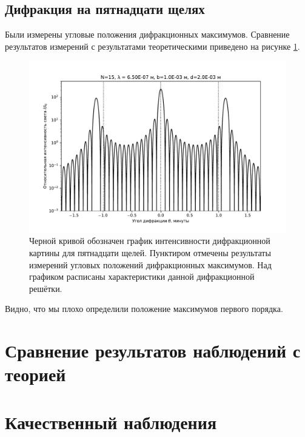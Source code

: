 \documentclass[12pt]{article}
\begin{document}
	\subsection{Дифракция на пятнадцати щелях}
	Были измерены угловые положения дифракционных максимумов. Сравнение результатов измерений с результатами теоретическими приведено на рисунке \ref{fig:figure4}.
	\begin{figure}[ht]
		\centering
		\includegraphics[width=\linewidth]{../plots/dif_15}
		\caption{Черной кривой обозначен график интенсивности дифракционной картины для пятнадцати щелей. Пунктиром отмечены результаты измерений угловых положений дифракционных максимумов. Над графиком расписаны характеристики данной дифракционной решётки.}
		\label{fig:figure4}
	\end{figure}
	Видно, что мы плохо определили положение максимумов первого порядка.


	\section{Сравнение результатов наблюдений с теорией}

	\section{Качественный наблюдения}
\end{document}

